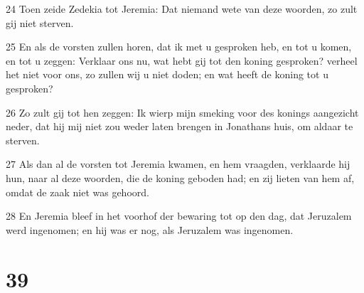 \par 24 Toen zeide Zedekia tot Jeremia: Dat niemand wete van deze woorden, zo zult gij niet sterven.
\par 25 En als de vorsten zullen horen, dat ik met u gesproken heb, en tot u komen, en tot u zeggen: Verklaar ons nu, wat hebt gij tot den koning gesproken? verheel het niet voor ons, zo zullen wij u niet doden; en wat heeft de koning tot u gesproken?
\par 26 Zo zult gij tot hen zeggen: Ik wierp mijn smeking voor des konings aangezicht neder, dat hij mij niet zou weder laten brengen in Jonathans huis, om aldaar te sterven.
\par 27 Als dan al de vorsten tot Jeremia kwamen, en hem vraagden, verklaarde hij hun, naar al deze woorden, die de koning geboden had; en zij lieten van hem af, omdat de zaak niet was gehoord.
\par 28 En Jeremia bleef in het voorhof der bewaring tot op den dag, dat Jeruzalem werd ingenomen; en hij was er nog, als Jeruzalem was ingenomen.

\chapter{39}

